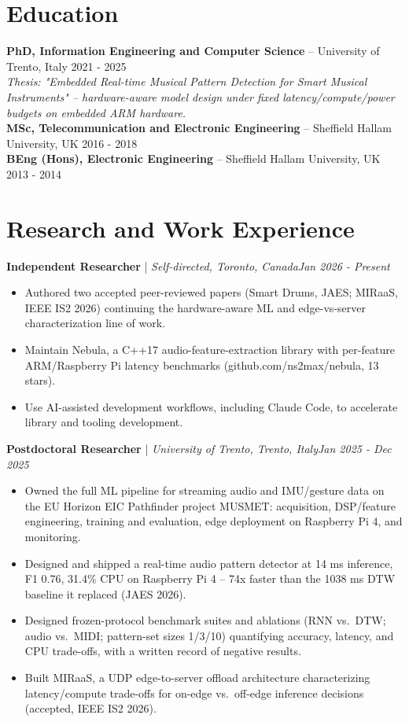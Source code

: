 \documentclass[11pt]{article}
\newenvironment{cvrole}[5]{%
  \par\noindent\textbf{\large #1} | \textit{\small #2, #3}\hfill \textit{\small #4 - #5}\par
  \begin{itemize}[leftmargin=2em, itemsep=-0.3em, topsep=-0.5em]%
}{%
  \end{itemize}\par\noindent\mbox{}\par\vspace{0.1em}%
}
\begin{document}
\section*{Education}
\textbf{PhD, Information Engineering and Computer Science} -- University of Trento, Italy \hfill 2021 - 2025 \\
\textit{Thesis: "Embedded Real-time Musical Pattern Detection for Smart Musical Instruments" -- hardware-aware model design under fixed latency/compute/power budgets on embedded ARM hardware.} \\
\textbf{MSc, Telecommunication and Electronic Engineering} -- Sheffield Hallam University, UK \hfill 2016 - 2018 \\
\textbf{BEng (Hons), Electronic Engineering} -- Sheffield Hallam University, UK \hfill 2013 - 2014

\section*{Research and Work Experience}

\begin{cvrole}{Independent Researcher}{Self-directed}{Toronto, Canada}{Jan 2026}{Present}
\item Authored two accepted peer-reviewed papers (Smart Drums, JAES; MIRaaS, IEEE IS2 2026) continuing the hardware-aware ML and edge-vs-server characterization line of work.
\item Maintain Nebula, a C++17 audio-feature-extraction library with per-feature ARM/Raspberry Pi latency benchmarks (github.com/ns2max/nebula, 13 stars).
\item Use AI-assisted development workflows, including Claude Code, to accelerate library and tooling development.
\end{cvrole}

\begin{cvrole}{Postdoctoral Researcher}{University of Trento}{Trento, Italy}{Jan 2025}{Dec 2025}
\item Owned the full ML pipeline for streaming audio and IMU/gesture data on the EU Horizon EIC Pathfinder project MUSMET: acquisition, DSP/feature engineering, training and evaluation, edge deployment on Raspberry Pi 4, and monitoring.
\item Designed and shipped a real-time audio pattern detector at 14 ms inference, F1 0.76, 31.4\% CPU on Raspberry Pi 4 -- 74x faster than the 1038 ms DTW baseline it replaced (JAES 2026).
\item Designed frozen-protocol benchmark suites and ablations (RNN vs.\ DTW; audio vs.\ MIDI; pattern-set sizes 1/3/10) quantifying accuracy, latency, and CPU trade-offs, with a written record of negative results.
\item Built MIRaaS, a UDP edge-to-server offload architecture characterizing latency/compute trade-offs for on-edge vs.\ off-edge inference decisions (accepted, IEEE IS2 2026).
\end{cvrole}
\end{document}
